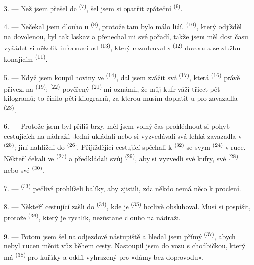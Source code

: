 3. --- Než jsem přešel do  \textsuperscript{(7)}, šel jsem si opatřit zpáteční
 \textsuperscript{(9)}.

4. --- Nečekal jsem dlouho u  \textsuperscript{(8)}, protože tam bylo málo
lidí.  \textsuperscript{(10)}, který odjížděl na dovolenou, byl tak laskav a
přenechal mi své pořadí, takže jsem měl dost času vyžádat si několik informací od
 \textsuperscript{(13)}, který rozmlouval s
 \textsuperscript{(12)} dozoru a se službu konajícím
 \textsuperscript{(11)}.

\VUsaut{3.0mm}

5. --- Když jsem koupil noviny ve  \textsuperscript{(14)}, dal jsem zvážit svá
 \textsuperscript{(17)}, která  \textsuperscript{(16)} právě
přivezl na  \textsuperscript{(19)}; 
\textsuperscript{(22)} pověřený
 \textsuperscript{(21)} mi oznámil, že můj kufr váží třicet pět
kilogramů; to činilo  pěti kilogramů, za kterou musím doplatit u
 pro zavazadla \textsuperscript{(23)}.

6. --- Protože jsem byl příliš brzy, měl jsem volný čas prohlédnout si pohyb cestujících na
nádraží. Jedni ukládali nebo si vyzvedávali svá lehká zavazadla v
 \textsuperscript{(25)}; jiní nahlíželi do 
\textsuperscript{(26)}. Přijíždějící cestující spěchali k 
\textsuperscript{(32)} se svým  \textsuperscript{(24)} v ruce. Někteří čekali
ve  \textsuperscript{(27)} a předkládali svůj
 \textsuperscript{(29)}, aby si vyzvedli své kufry, své 
\textsuperscript{(28)} nebo své  \textsuperscript{(30)}.

7. ---  \textsuperscript{(33)} pečlivě prohlíželi balíky, aby
zjistili, zda někdo nemá něco k proclení.

8. --- Někteří cestující zašli do  \textsuperscript{(34)}, kde je
 \textsuperscript{(35)} horlivě obsluhoval. Musí si pospíšit, protože
 \textsuperscript{(36)}, který je rychlík, nezůstane dlouho na nádraží.

9. --- Potom jsem šel na odjezdové nástupiště a hledal jsem přímý 
\textsuperscript{(37)}, abych nebyl nucen měnit vůz během cesty. Nastoupil jsem do vozu s
chodbičkou, který má  \textsuperscript{(38)} pro kuřáky a oddíl vyhrazený pro
«dámy bez doprovodu».

